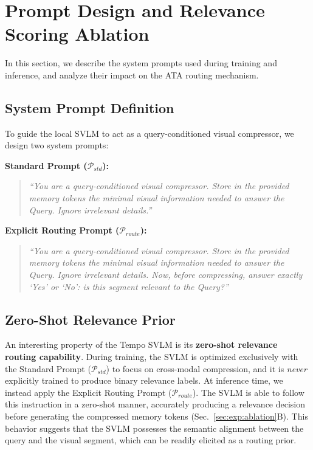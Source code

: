 \section{Prompt Design and Relevance Scoring Ablation}
\label{supp:prompts_ablation}

In this section, we describe the system prompts used during training and inference, and analyze their impact on the ATA routing mechanism.

\subsection{System Prompt Definition}

To guide the local SVLM to act as a query-conditioned visual compressor, we design two system prompts:

\vspace{0.5em}
\noindent\textbf{Standard Prompt ($\mathcal{P}_{std}$):}
\begin{quote}
\textit{``You are a query-conditioned visual compressor. Store in the provided memory tokens the minimal visual information needed to answer the Query. Ignore irrelevant details.''}
\end{quote}

\noindent\textbf{Explicit Routing Prompt ($\mathcal{P}_{route}$):}
\begin{quote}
\textit{``You are a query-conditioned visual compressor. Store in the provided memory tokens the minimal visual information needed to answer the Query. Ignore irrelevant details. Now, before compressing, answer exactly `Yes' or `No': is this segment relevant to the Query?''}
\end{quote}

\subsection{Zero-Shot Relevance Prior}

An interesting property of the Tempo SVLM is its \textbf{zero-shot relevance routing capability}. During training, the SVLM is optimized exclusively with the Standard Prompt ($\mathcal{P}_{std}$) to focus on cross-modal compression, and it is \emph{never} explicitly trained to produce binary relevance labels.
%
At inference time, we instead apply the Explicit Routing Prompt ($\mathcal{P}_{route}$). The SVLM is able to follow this instruction in a zero-shot manner, accurately producing a relevance decision before generating the compressed memory tokens (Sec.~\ref{sec:exp:ablation}B). This behavior suggests that the SVLM possesses the semantic alignment between the query and the visual segment, which can be readily elicited as a routing prior.

